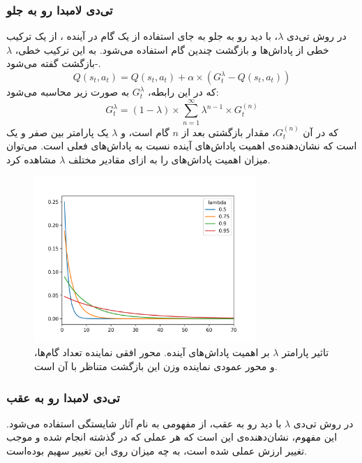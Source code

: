 \subsubsection{ تی‌دی لامبدا رو به جلو}
در روش تی‌دی $\lambda$،
با دید رو به جلو
به جای استفاده از یک گام در آینده ، از یک ترکیب خطی از پاداش‌ها و بازگشت چندین گام استفاده می‌شود.
به این ترکیب خطی، $\lambda$-بازگشت گفته می‌شود.
\begin{equation}\label{eq:td_lambda_q_function}
    Q(s_t, a_t) = Q(s_t, a_t) + \alpha \times (G_t^\lambda - Q(s_t, a_t))
\end{equation}
که در این رابطه، $G_t^\lambda$
به صورت زیر محاسبه می‌شود:
\begin{equation}\label{eq:td_lambda_return}
    G_t^\lambda = (1-\lambda)\times\sum_{n=1}^\infty \lambda^{n-1} \times G_t^{(n)}
\end{equation}
که در آن $G_t^{(n)}$، 
مقدار بازگشتی بعد از $n$ گام است،
و $\lambda$
یک پارامتر بین صفر و یک است که نشان‌دهنده‌ی اهمیت پاداش‌های آینده نسبت به پاداش‌های فعلی است.
می‌توان میزان اهمیت پاداش‌های را به ازای مقادیر مختلف $\lambda$ مشاهده کرد.
\begin{figure}[H]
    \centering
    \includegraphics[width=0.75\textwidth]{images/lambda_return_weight.png}
    \caption{تاثیر پارامتر  $\lambda$ بر اهمیت پاداش‌های آینده. 
    محور افقی نماینده تعداد گام‌ها، و محور عمودی نماینده وزن این بازگشت متناظر با آن است.}\label{fig:td_lambda}
    
\end{figure}
\subsubsection{تی‌دی لامبدا رو به عقب}
در روش تی‌دی $\lambda$ با دید رو به عقب،
از مفهومی به نام آثار شایستگی استفاده می‌شود.
این مفهوم، نشان‌دهنده‌ی این است که هر عملی که در گذشته انجام شده و موجب تغییر ارزش عملی شده است،  به چه میزان روی این تغییر سهیم بوده‌است\cite{geist2014off}.

